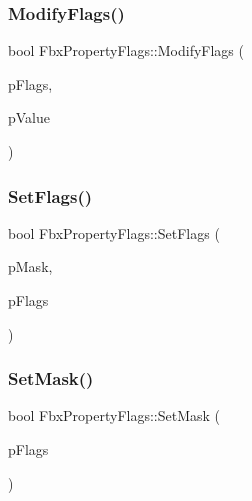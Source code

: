\mbox{\label{class_fbx_property_flags_a639336bbcff51b3a39768be85f030fab}} 
\subsubsection{\texorpdfstring{Modify\+Flags()}{ModifyFlags()}}
{\footnotesize\ttfamily bool Fbx\+Property\+Flags\+::\+Modify\+Flags (\begin{DoxyParamCaption}\item[{\hyperlink{class_fbx_property_flags_afabfa7e0949aac8a7dcdf8a141867e99}{Fbx\+Property\+Flags\+::\+E\+Flags}}]{p\+Flags,  }\item[{bool}]{p\+Value }\end{DoxyParamCaption})}

\mbox{\label{class_fbx_property_flags_ab5187f4e4f41cb15b59fed3f114036d8}} 
\subsubsection{\texorpdfstring{Set\+Flags()}{SetFlags()}}
{\footnotesize\ttfamily bool Fbx\+Property\+Flags\+::\+Set\+Flags (\begin{DoxyParamCaption}\item[{\hyperlink{class_fbx_property_flags_afabfa7e0949aac8a7dcdf8a141867e99}{Fbx\+Property\+Flags\+::\+E\+Flags}}]{p\+Mask,  }\item[{\hyperlink{class_fbx_property_flags_afabfa7e0949aac8a7dcdf8a141867e99}{Fbx\+Property\+Flags\+::\+E\+Flags}}]{p\+Flags }\end{DoxyParamCaption})}

\mbox{\label{class_fbx_property_flags_a527b20839865439acfb1ea9e24a67a2e}} 
\subsubsection{\texorpdfstring{Set\+Mask()}{SetMask()}}
{\footnotesize\ttfamily bool Fbx\+Property\+Flags\+::\+Set\+Mask (\begin{DoxyParamCaption}\item[{\hyperlink{class_fbx_property_flags_afabfa7e0949aac8a7dcdf8a141867e99}{Fbx\+Property\+Flags\+::\+E\+Flags}}]{p\+Flags }\end{DoxyParamCaption})}


